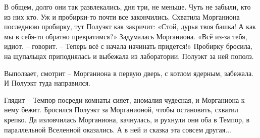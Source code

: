 \documentclass[ebook,oneside,final,openright]{memoir}
\begin{document}
В общем, долго они так развлекались, дня три, не меньше. Чуть не забыли, кто из них кто. Уж и пробирки-то почти все закончились. Схватила Морганиона последнюю пробирку, тут Полуэкт как закричит: «Стой, дурья твоя башка! А как мы в себя-то обратно превратимся?» Задумалась Морганиона. «Всё из-за тебя, идиот, – говорит. – Теперь всё с начала начинать придется!» Пробирку бросила, на щупальцах приподнялась и выбежала из лаборатории. Полуэкт за ней пополз.\par
\par
Выползает, смотрит – Морганиона в первую дверь, с котлом ядерным, забежала. И Полуэкт туда направился.\par
\par
Глядит – Темпор посреди комнаты сияет, аномалия чудесная, и Морганиона к нему бежит. Бросился Полуэкт за Морганионой, чтобы остановить, схватил крепко. Да изловчилась Морганиона, качнулась, и рухнули они оба в Темпор, в параллельной Вселенной оказались. А в ней и сказка эта совсем другая...\par
\end{document}
